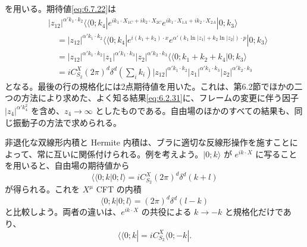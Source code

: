を用いる。期待値\eqref{eq:6.7.22}は
\begin{equation}
\begin{aligned}
&|z_{12}|^{\alpha'k_1\cdot k_2}
\langle\!\langle0;k_4|
e^{ik_1\cdot X_{1C}+ik_2\cdot X_{2C}}
e^{ik_1\cdot X_{1A}+ik_2\cdot X_{2A}}|0;k_3\rangle\\
&\quad=|z_{12}|^{\alpha'k_1\cdot k_2}
\langle\!\langle0;k_4|
e^{i(k_1+k_2)\cdot x}
e^{\alpha'(k_1\ln|z_1|+k_2\ln|z_2|)\cdot p}|0;k_3\rangle\\
&\quad=|z_{12}|^{\alpha'k_1\cdot k_2}
|z_1|^{\alpha'k_1\cdot k_3}|z_2|^{\alpha'k_2\cdot k_3}
\langle\!\langle0;k_1+k_2+k_4|0;k_3\rangle\\
&\quad=iC^X_{S_2}(2\pi)^d\delta^d\left(\sum_i k_i\right)
|z_{12}|^{\alpha'k_1\cdot k_2}
|z_1|^{\alpha'k_1\cdot k_3}|z_2|^{\alpha'k_2\cdot k_3}
\end{aligned}
\tag{6.7.24}\label{eq:6.7.24}
\end{equation}
となる。最後の行の規格化には2点期待値を用いた。これは、第6.2節でほかの二つの方法により求めた、よく知る結果\eqref{eq:6.2.31}に、フレームの変更に伴う因子 $|z_4|^{\alpha'k_4^2}$ を含め、$z_4\to\infty$ としたものである。自由場のほかのすべての結果も、同じ振動子の方法で求められる。


非退化な双線形内積と Hermite 内積は、ブラに適切な反線形操作を施すことによって、常に互いに関係付けられる。例を考えよう。$|0;k\rangle$ が $e^{ik\cdot X}$ に写ることを用いると、自由場の期待値から
\begin{equation}
\langle\!\langle0;k|0;l\rangle
=iC^X_{S_2}(2\pi)^d\delta^d(k+l)
\tag{6.7.25}\label{eq:6.7.25}
\end{equation}
が得られる。これを $X^\mu$ CFT の内積
\begin{equation}
\langle0;k|0;l\rangle=(2\pi)^d\delta^d(l-k)
\tag{6.7.26}\label{eq:6.7.26}
\end{equation}
と比較しよう。両者の違いは、$e^{ik\cdot X}$ の共役による $k\to-k$ と規格化だけであり、
\begin{equation}
\langle\!\langle0;k|=iC^X_{S_2}\langle0;-k|.
\tag{6.7.27}\label{eq:6.7.27}
\end{equation}

